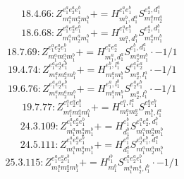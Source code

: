 \documentclass[letterpaper,10pt,fleqn,leqno,onecolumn]{article}
\begin{document}
\begin{equation} \;\;\;\;\;\;  18.4.66: Z^{e_{1}^{a}e_{2}^{a}e_{1}^{b}}_{m_{1}^{a}m_{2}^{a}m_{1}^{b}}+=H^{e_{1}^{a}e_{1}^{b}}_{m_{1}^{b},d_{1}^{a}}S^{e_{2}^{a},d_{1}^{a}}_{m_{1}^{a}m_{2}^{a}} \end{equation}
\begin{equation} \;\;\;\;\;\;  18.6.68: Z^{e_{1}^{a}e_{2}^{a}e_{1}^{b}}_{m_{1}^{a}m_{2}^{a}m_{1}^{b}}+=H^{e_{1}^{a}e_{1}^{b}}_{m_{1}^{a},d_{1}^{b}}S^{e_{2}^{a},d_{1}^{b}}_{m_{2}^{a}m_{1}^{b}} \end{equation}
\begin{equation} \;\;\;\;\;\;  18.7.69: Z^{e_{1}^{a}e_{2}^{a}e_{1}^{b}}_{m_{1}^{a}m_{2}^{a}m_{1}^{b}}+=H^{e_{1}^{a}e_{2}^{a}}_{m_{1}^{a},d_{1}^{a}}S^{e_{1}^{b},d_{1}^{a}}_{m_{2}^{a}m_{1}^{b}}\cdot -1/1 \end{equation}
\begin{equation} \;\;\;\;\;\;  19.4.74: Z^{e_{1}^{a}e_{2}^{a}e_{1}^{b}}_{m_{1}^{a}m_{2}^{a}m_{1}^{b}}+=H^{e_{1}^{b},l_{1}^{a}}_{m_{1}^{a}m_{1}^{b}}S^{e_{1}^{a}e_{2}^{a}}_{m_{2}^{a},l_{1}^{a}}\cdot -1/1 \end{equation}
\begin{equation} \;\;\;\;\;\;  19.6.76: Z^{e_{1}^{a}e_{2}^{a}e_{1}^{b}}_{m_{1}^{a}m_{2}^{a}m_{1}^{b}}+=H^{e_{1}^{a},l_{1}^{b}}_{m_{1}^{a}m_{1}^{b}}S^{e_{2}^{a}e_{1}^{b}}_{m_{2}^{a},l_{1}^{b}}\cdot -1/1 \end{equation}
\begin{equation} \;\;\;\;\;\;  19.7.77: Z^{e_{1}^{a}e_{2}^{a}e_{1}^{b}}_{m_{1}^{a}m_{2}^{a}m_{1}^{b}}+=H^{e_{1}^{a},l_{1}^{a}}_{m_{1}^{a}m_{2}^{a}}S^{e_{2}^{a}e_{1}^{b}}_{m_{1}^{b},l_{1}^{a}} \end{equation}
\begin{equation} \;\;\;\;\;\;  24.3.109: Z^{e_{1}^{a}e_{2}^{a}e_{1}^{b}}_{m_{1}^{a}m_{2}^{a}m_{1}^{b}}+=H^{e_{1}^{b}}_{d_{1}^{b}}S^{e_{1}^{a}e_{2}^{a},d_{1}^{b}}_{m_{1}^{a}m_{2}^{a}m_{1}^{b}} \end{equation}
\begin{equation} \;\;\;\;\;\;  24.5.111: Z^{e_{1}^{a}e_{2}^{a}e_{1}^{b}}_{m_{1}^{a}m_{2}^{a}m_{1}^{b}}+=H^{e_{1}^{a}}_{d_{1}^{a}}S^{e_{2}^{a}e_{1}^{b},d_{1}^{a}}_{m_{1}^{a}m_{2}^{a}m_{1}^{b}} \end{equation}
\begin{equation} \;\;\;\;\;\;  25.3.115: Z^{e_{1}^{a}e_{2}^{a}e_{1}^{b}}_{m_{1}^{a}m_{2}^{a}m_{1}^{b}}+=H^{l_{1}^{b}}_{m_{1}^{b}}S^{e_{1}^{a}e_{2}^{a}e_{1}^{b}}_{m_{1}^{a}m_{2}^{a},l_{1}^{b}}\cdot -1/1 \end{equation}
\end{document}
